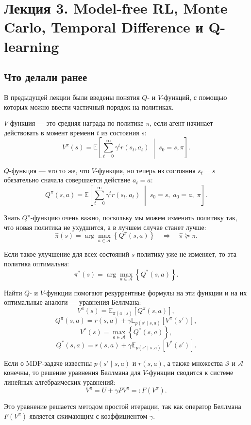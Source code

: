 \documentclass[12pt,a4paper]{article}
\begin{document}
\section{Лекция 3. Model-free RL, Monte Carlo, Temporal Difference и Q-learning}

\subsection{Что делали ранее}

В предыдущей лекции были введены понятия $Q$- и $V$-функций, с помощью которых можно ввести частичный порядок на политиках.

$V$-функция --- это средняя награда по политике $\pi$, если агент начинает действовать в момент времени $t$ из состояния $s$:
\[
V^\pi(s)
=
\mathbb E
\left[
\sum_{t=0}^{\infty}
\gamma^t r(s_t,a_t)
\;\middle|\;
s_0=s,\pi
\right].
\]

$Q$-функция --- это то же, что $V$-функция, но теперь из состояния $s_t=s$ обязательно сначала совершается действие $a_t=a$:
\[
Q^\pi(s,a)
=
\mathbb E
\left[
\sum_{t=0}^{\infty}
\gamma^t r(s_t,a_t)
\;\middle|\;
s_0=s,\;a_0=a,\;\pi
\right].
\]

Знать $Q^\pi$-функцию очень важно, поскольку мы можем изменить политику так, что новая политика не ухудшится, а в лучшем случае станет лучше:
\[
\hat\pi(s)
=
\arg\max_{a \in \mathcal A}
\left\{
Q^\pi(s,a)
\right\}
\quad
\Longrightarrow
\quad
\hat\pi \succeq \pi.
\]

Если такое улучшение для всех состояний $s$ политику уже не изменяет, то эта политика оптимальна:
\[
\pi^\ast(s)
=
\arg\max_{a \in \mathcal A}
\left\{
Q^\ast(s,a)
\right\}.
\]

Найти $Q$- и $V$-функции помогают рекуррентные формулы на эти функции и на их оптимальные аналоги --- уравнения Беллмана:
\[
V^\pi(s)
=
\mathbb E_{\pi(a\mid s)}
\left[
Q^\pi(s,a)
\right],
\]
\[
Q^\pi(s,a)
=
r(s,a)
+
\gamma
\mathbb E_{p(s'\mid s,a)}
\left[
V^\pi(s')
\right],
\]
\[
V^\ast(s)
=
\max_{a \in \mathcal A}
\left\{
Q^\ast(s,a)
\right\},
\]
\[
Q^\ast(s,a)
=
r(s,a)
+
\gamma
\mathbb E_{p(s'\mid s,a)}
\left[
V^\ast(s')
\right].
\]

Если о MDP-задаче известны $p(s'\mid s,a)$ и $r(s,a)$, а также множества $\mathcal S$ и $\mathcal A$ конечны, то решение уравнения Беллмана для $V$-функции сводится к системе линейных алгебраических уравнений:
\[
V^\pi
=
U+\gamma P V^\pi
=:
F(V^\pi).
\]

Это уравнение решается методом простой итерации, так как оператор Беллмана $F(V^\pi)$ является сжимающим с коэффициентом $\gamma$.
\end{document}
